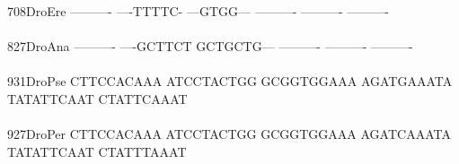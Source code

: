\documentclass[11pt,twoside,reqno,a4paper]{article}
\begin{document}
{708\hspace*{2\charwidth}DroEre	----------	----TTTTC-	---GTGG---	----------	----------	----------	\\
\hspace*{5\charwidth}\hspace*{7\charwidth}\hspace*{1\charwidth}\hspace*{1\charwidth}\hspace*{1\charwidth}\hspace*{1\charwidth}\hspace*{1\charwidth}\hspace*{1\charwidth}\\
827\hspace*{2\charwidth}DroAna	----------	----GCTTCT	GCTGCTG---	----------	----------	----------	\\
\hspace*{5\charwidth}\hspace*{7\charwidth}\hspace*{1\charwidth}\hspace*{1\charwidth}\hspace*{1\charwidth}\hspace*{1\charwidth}\hspace*{1\charwidth}\hspace*{1\charwidth}\\
931\hspace*{2\charwidth}DroPse	CTTCCACAAA	ATCCTACTGG	GCGGTGGAAA	AGATGAAATA	TATATTCAAT	CTATTCAAAT	\\
\hspace*{5\charwidth}\hspace*{7\charwidth}\hspace*{1\charwidth}\hspace*{1\charwidth}\hspace*{1\charwidth}\hspace*{1\charwidth}\hspace*{1\charwidth}\hspace*{1\charwidth}\\
927\hspace*{2\charwidth}DroPer	CTTCCACAAA	ATCCTACTGG	GCGGTGGAAA	AGATCAAATA	TATATTCAAT	CTATTTAAAT	\\
\hspace*{5\charwidth}\hspace*{7\charwidth}\hspace*{1\charwidth}\hspace*{1\charwidth}\hspace*{1\charwidth}\hspace*{1\charwidth}\hspace*{1\charwidth}\hspace*{1\charwidth}\\
}
\end{document}
